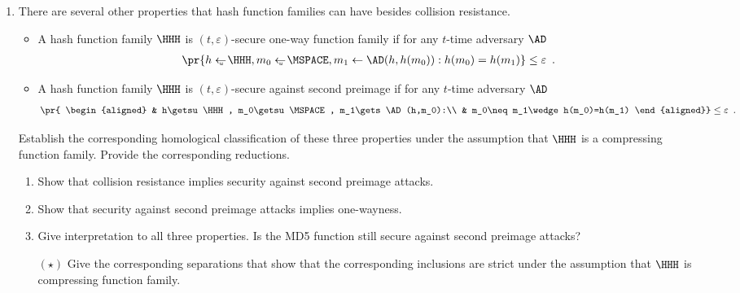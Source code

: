 \documentclass{article}
\begin{document}
\begin{enumerate}
\item There are several other properties that hash function families
  can have besides collision resistance.
  \begin{itemize}
  \item A hash function family $\HHH$ is $(t,\varepsilon)$-secure
    one-way function family if for any $t$-time adversary $\AD$
    \begin{align*}
      \pr{h\getsu\HHH, m_0\getsu\MSPACE, m_1\gets\AD(h,h(m_0)): h(m_0)=h(m_1)}\leq\varepsilon\enspace.
    \end{align*}
  \item A hash function family $\HHH$ is $(t,\varepsilon)$-secure
    against second preimage if for any $t$-time adversary $\AD$
    \begin{align*}
      \pr{
        \begin{aligned}
         & h\getsu\HHH, m_0\getsu\MSPACE, m_1\gets \AD(h,m_0):\\
         & m_0\neq m_1\wedge h(m_0)=h(m_1)
        \end{aligned}}\leq\varepsilon\enspace.
    \end{align*}
  \end{itemize}
  Establish the corresponding homological classification of these
  three properties under the assumption that $\HHH$ is a compressing
  function family. Provide the corresponding reductions.
  \begin{enumerate}
  \item Show that collision resistance implies security against second
    preimage attacks.
  \item Show that security against second preimage attacks implies
    one-wayness.
  \item Give interpretation to all three properties. Is the MD5
    function still secure against second preimage attacks?
  \item[$(\star)$] Give the corresponding separations that show that
    the corresponding inclusions are strict under the assumption that
    $\HHH$ is compressing function family.
  \end{enumerate}




\end{enumerate}
\end{document}
